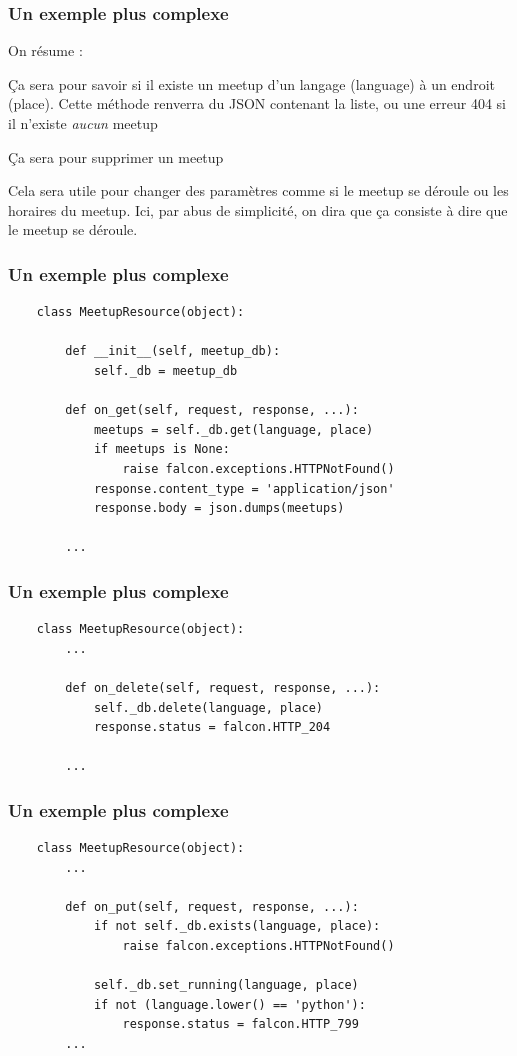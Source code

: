 \documentclass[10pt, compress]{beamer}
\begin{document}
\begin{frame}[fragile]
	\frametitle{Un exemple plus complexe}
    
    On résume :
    \pause
    \begin{description}[<+->]
    	\item[GET] Ça sera pour savoir si il existe un meetup d'un langage (language) à un endroit (place). Cette méthode renverra du JSON contenant la liste, ou une erreur 404 si il n'existe \emph{aucun} meetup
        \item[DELETE] Ça sera pour supprimer un meetup
        \item[PUT] Cela sera utile pour changer des paramètres comme si le meetup se déroule ou les horaires du meetup. Ici, par abus de simplicité, on dira que ça consiste à dire que le meetup se déroule.
	\end{description}
\end{frame}
\begin{frame}[fragile]
	\frametitle{Un exemple plus complexe}
    
    \begin{verbatim}
    class MeetupResource(object):
    
        def __init__(self, meetup_db):
            self._db = meetup_db

        def on_get(self, request, response, ...):
            meetups = self._db.get(language, place)
            if meetups is None:
                raise falcon.exceptions.HTTPNotFound()
            response.content_type = 'application/json'
            response.body = json.dumps(meetups)
		
        ...
    \end{verbatim}
\end{frame}
\begin{frame}[fragile]
	\frametitle{Un exemple plus complexe}
    
    \begin{verbatim}
    class MeetupResource(object):
        ...
        
        def on_delete(self, request, response, ...):
            self._db.delete(language, place)
            response.status = falcon.HTTP_204

		...
     \end{verbatim}
\end{frame}

\begin{frame}[fragile]
	\frametitle{Un exemple plus complexe}
    
    \begin{verbatim}
    class MeetupResource(object):
        ...
        
        def on_put(self, request, response, ...):
            if not self._db.exists(language, place):
                raise falcon.exceptions.HTTPNotFound()

            self._db.set_running(language, place)
            if not (language.lower() == 'python'):
                response.status = falcon.HTTP_799   
        ...
    \end{verbatim}
\end{frame}
\end{document}
